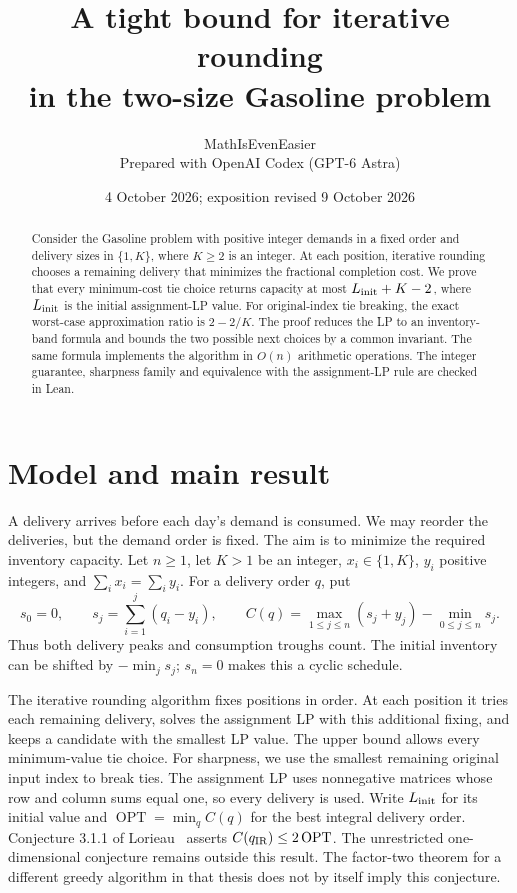 \documentclass[11pt]{article}
\title{A tight bound for iterative rounding\\in the two-size Gasoline problem}
\author{MathIsEvenEasier\\\small Prepared with OpenAI Codex (GPT-6 Astra)}
\date{4 October 2026; exposition revised 9 October 2026}
\newcommand{\OPT}{\operatorname{OPT}}
\begin{document}
\maketitle
\begin{abstract}
Consider the Gasoline problem with positive integer demands in a fixed
order and delivery sizes in $\{1,K\}$, where $K\ge2$ is an integer.
At each position, iterative rounding chooses a remaining delivery that
minimizes the fractional completion cost. We prove that every minimum-cost
tie choice returns capacity at most $L_{\rm init}+K-2$, where
$L_{\rm init}$ is the initial assignment-LP value. For original-index tie
breaking, the exact worst-case approximation ratio is $2-2/K$.
The proof reduces the LP to an inventory-band formula and bounds the two
possible next choices by a common invariant. The same formula implements
the algorithm in $O(n)$ arithmetic operations. The integer guarantee,
sharpness family and equivalence with the assignment-LP rule are checked
in Lean.
\end{abstract}

\section{Model and main result}\label{sec:model}
A delivery arrives before each day's demand is consumed. We may reorder
the deliveries, but the demand order is fixed. The aim is to minimize the
required inventory capacity. Let $n\ge1$, let $K>1$ be an integer, $x_i\in\{1,K\}$, $y_i$ positive integers, and
$\sum_i x_i=\sum_i y_i$. For a delivery order $q$, put
\[
s_0=0,\qquad s_j=\sum_{i=1}^j(q_i-y_i),\qquad
C(q)=\max_{1\le j\le n}(s_j+y_j)-\min_{0\le j\le n}s_j.
\]
Thus both delivery peaks and consumption troughs count. The initial inventory
can be shifted by $-\min_j s_j$; $s_n=0$ makes this a cyclic schedule.

The iterative rounding algorithm fixes positions in order. At each position it
tries each remaining delivery, solves the assignment LP with this additional
fixing, and keeps a candidate with the smallest LP value. The upper bound allows every minimum-value tie choice. For sharpness,
we use the smallest remaining original input index to break ties. The
assignment LP uses nonnegative matrices whose row and column sums equal
one, so every delivery is used. Write $L_{\rm init}$ for its initial
value and $\OPT=\min_q C(q)$ for the best integral delivery order. Conjecture 3.1.1 of
Lorieau~\cite[p.~21]{lorieau}
asserts $C(q_{\rm IR})\le2\OPT$. The unrestricted one-dimensional
conjecture remains outside this result.
The factor-two theorem for a different greedy algorithm in that thesis does
not by itself imply this conjecture.
\end{document}
